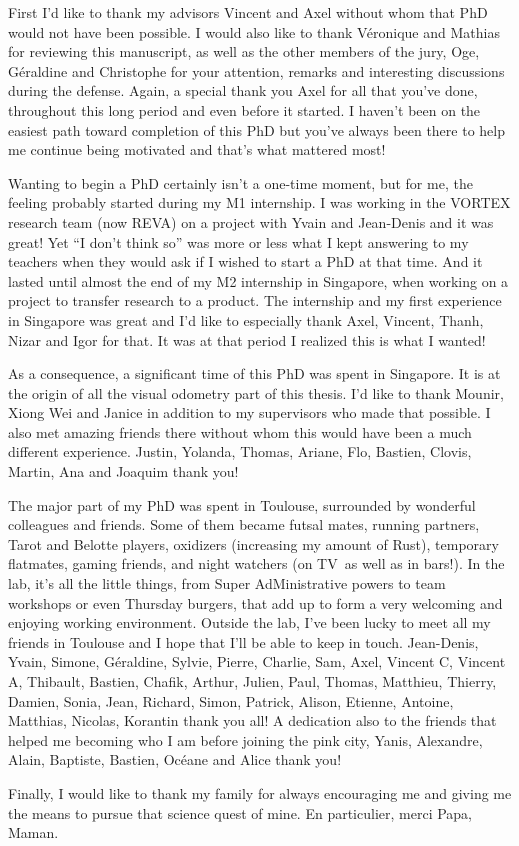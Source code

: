 First I'd like to thank my advisors Vincent and Axel without whom
that PhD would not have been possible.
I would also like to thank Véronique and Mathias for reviewing this manuscript,
as well as the other members of the jury, Oge, Géraldine and Christophe for your attention,
remarks and interesting discussions during the defense.
Again, a special thank you Axel
for all that you've done, throughout this long period and even before it started.
I haven't been on the easiest path toward completion of this PhD but you've
always been there to help me continue being motivated and that's what mattered most!


Wanting to begin a PhD certainly isn't a one-time moment,
but for me, the feeling probably started during my M1 internship.
I was working in the VORTEX research team (now REVA)
on a project with Yvain and Jean-Denis and it was great!
Yet ``I don't think so'' was more or less what I kept answering to my teachers
when they would ask if I wished to start a PhD at that time.
And it lasted until almost the end of my M2 internship in Singapore,
when working on a project to transfer research to a product.
The internship and my first experience in Singapore was great and I'd like
to especially thank Axel, Vincent, Thanh, Nizar and Igor for that.
It was at that period I realized this is what I wanted!


As a consequence, a significant time of this PhD was spent in Singapore.
It is at the origin of all the visual odometry part of this thesis.
I'd like to thank Mounir, Xiong Wei and Janice in addition
to my supervisors who made that possible.
I also met amazing friends there
without whom this would have been a much different experience.
Justin, Yolanda, Thomas, Ariane, Flo, Bastien, Clovis, Martin, Ana and Joaquim thank you!


The major part of my PhD was spent in Toulouse,
surrounded by wonderful colleagues and friends.
Some of them became futsal mates, running partners,
Tarot and Belotte players, oxidizers (increasing my amount of Rust),
temporary flatmates,
gaming friends, and night watchers (on TV as well as in bars!).
In the lab, it's all the little things, from Super AdMinistrative powers
to team workshops or even Thursday burgers,
that add up to form a very welcoming and enjoying working environment.
Outside the lab, I've been lucky to meet all my friends in Toulouse
and I hope that I'll be able to keep in touch.
Jean-Denis, Yvain, Simone, Géraldine, Sylvie, Pierre, Charlie, Sam,
Axel, Vincent C, Vincent A, Thibault, Bastien, Chafik, Arthur, Julien, Paul,
Thomas, Matthieu, Thierry,
Damien, Sonia, Jean, Richard, Simon, Patrick, Alison, Etienne,
Antoine, Matthias, Nicolas, Korantin thank you all!
A dedication also to the friends that helped me becoming who I am
before joining the pink city, Yanis, Alexandre, Alain, Baptiste,
Bastien, Océane and Alice thank you!


Finally, I would like to thank my family for always encouraging me
and giving me the means to pursue that science quest of mine.
En particulier, merci Papa, Maman.
